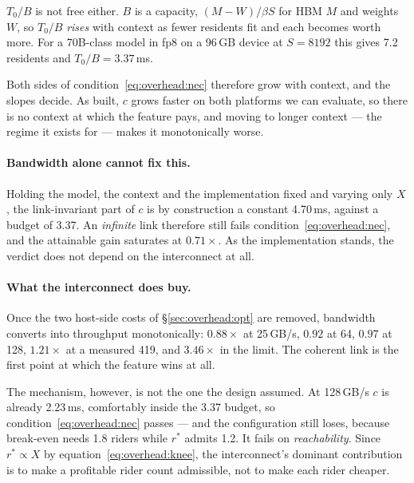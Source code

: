 $T_0/B$ is not free either. $B$ is a capacity, $(M - W)/\beta S$ for HBM $M$ and
weights $W$, so $T_0/B$ \emph{rises} with context as fewer residents fit and
each becomes worth more. For a 70B-class model in fp8 on a 96\,GB device at
$S{=}8192$ this gives 7.2 residents and $T_0/B = 3.37$\,ms.

Both sides of condition~\ref{eq:overhead:nec} therefore grow with context, and
the slopes decide. As built, $c$ grows faster on both platforms we can evaluate,
so there is no context at which the feature pays, and moving to longer context
--- the regime it exists for --- makes it monotonically worse.

\paragraph{Bandwidth alone cannot fix this.} Holding the model, the context and
the implementation fixed and varying only $X$, the link-invariant part of $c$ is
by construction a constant 4.70\,ms, against a budget of 3.37. An
\emph{infinite} link therefore still fails condition~\ref{eq:overhead:nec}, and
the attainable gain saturates at $0.71\times$. As the implementation stands, the
verdict does not depend on the interconnect at all.

\paragraph{What the interconnect does buy.} Once the two host-side costs of
\S\ref{sec:overhead:opt} are removed, bandwidth converts into throughput
monotonically: $0.88\times$ at 25\,GB/s, $0.92$ at 64, $0.97$ at 128,
$1.21\times$ at a measured 419, and $3.46\times$ in the limit. The coherent link
is the first point at which the feature wins at all.

The mechanism, however, is not the one the design assumed. At 128\,GB/s $c$ is
already 2.23\,ms, comfortably inside the 3.37 budget, so
condition~\ref{eq:overhead:nec} passes --- and the configuration still loses,
because break-even needs 1.8 riders while $r^{*}$ admits 1.2. It fails on
\emph{reachability}. Since $r^{*} \propto X$ by
equation~\ref{eq:overhead:knee}, the interconnect's dominant contribution is to
make a profitable rider count admissible, not to make each rider cheaper.

